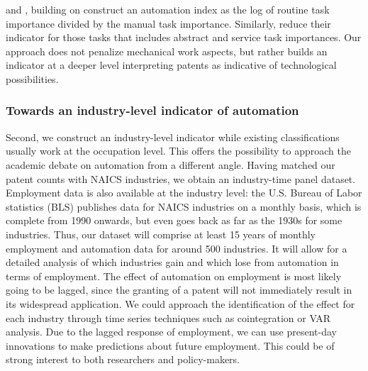 \documentclass[11pt,a4paper]{article}
\begin{document}
\cite{AKK2008} and \cite{AD2013}, building on \cite{ALM2003} construct an automation index as the log of routine task importance divided by the manual task importance. Similarly, \cite{GMS2014} reduce their indicator for those tasks that includes abstract and service task importances. Our approach does not penalize mechanical work aspects, but rather builds an indicator at a deeper level interpreting patents as indicative of technological possibilities.


\subsubsection*{Towards an industry-level indicator of automation}
Second, we construct an industry-level indicator while existing classifications usually work at the occupation level. This offers the possibility to approach the academic debate on automation from a different angle. Having matched our patent counts with NAICS industries, we obtain an industry-time panel dataset. Employment data is also available at the industry level: the U.S. Bureau of Labor statistics (BLS) publishes data for NAICS industries on a monthly basis, which is complete from 1990 onwards, but even goes back as far as the 1930s for some industries. Thus, our dataset will comprise at least 15 years of monthly employment and automation data for around 500 industries. It will allow for a detailed analysis of which industries gain and which lose from automation in terms of employment. The effect of automation on employment is most likely going to be lagged, since the granting of a patent will not immediately result in its widespread application. We could approach the identification of the effect for each industry through time series techniques such as cointegration or VAR analysis. Due to the lagged response of employment, we can use present-day innovations to make predictions about future employment. This could be of strong interest to both researchers and policy-makers.
\end{document}

